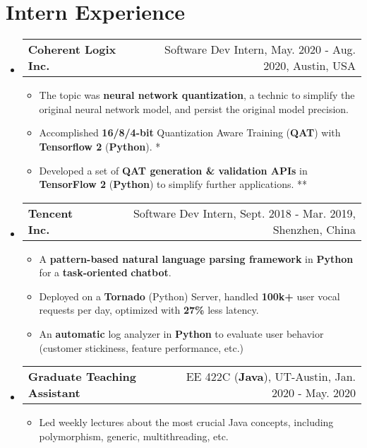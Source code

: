 \documentclass[letterpaper,11pt]{article}
\makeatletter
\newcommand{\resumeItem}[1]{
  \item\small{
    {#1 \vspace{-2pt}}
  }
}
\newcommand{\internSubheading}[2]{
	\vspace{-1pt}\item
	\begin{tabular*}{0.97\textwidth}[t]{l@{\extracolsep{\fill}}r}
		\textbf{#1} & #2 \\
	\end{tabular*}\vspace{-6.5pt}
}
\newcommand{\resumeSubHeadingListStart}{\begin{itemize}[leftmargin=*]}
\newcommand{\resumeSubHeadingListEnd}{\end{itemize}}
\newcommand{\resumeItemListStart}{\begin{itemize}}
\newcommand{\resumeItemListEnd}{\end{itemize}\vspace{-5pt}}
\makeatother
\begin{document}
\section{Intern Experience}
  \resumeSubHeadingListStart
  	\internSubheading
  	{Coherent Logix Inc.}{Software Dev Intern, May. 2020 - Aug. 2020, Austin, USA}
  	\resumeItemListStart
  	\resumeItem
  	{The topic was \textbf{neural network quantization}, a technic to simplify the original neural network model, and persist the original model precision.}
  	\resumeItem
  	{Accomplished \textbf{16/8/4-bit} Quantization Aware Training (\textbf{QAT}) with \textbf{Tensorflow 2} (\textbf{Python}). *}
  	\resumeItem
  	{Developed a set of \textbf{QAT generation \& validation APIs} in \textbf{TensorFlow 2} (\textbf{Python}) to simplify further applications. **}
  	\resumeItemListEnd
  	
    \internSubheading
      {Tencent Inc.}{Software Dev Intern, Sept. 2018 - Mar. 2019, Shenzhen, China}
      \resumeItemListStart
      	\resumeItem
      	  {A \textbf{pattern-based natural language parsing framework} in \textbf{Python} for a \textbf{task-oriented} \textbf{chatbot}. }
      	\resumeItem
          {Deployed on a \textbf{Tornado} (Python) Server, handled \textbf{100k+} user vocal requests per day, optimized with \textbf{27\%} less latency.} 
        \resumeItem
          {An \textbf{automatic} log analyzer in \textbf{Python} to evaluate user behavior (customer stickiness, feature performance, etc.)}
      \resumeItemListEnd
      \internSubheading
      {Graduate Teaching Assistant}
      {EE 422C (\textbf{Java}), UT-Austin, Jan. 2020 - May. 2020}
      \resumeItemListStart
      \resumeItem
      {Led weekly lectures about the most crucial Java concepts, including polymorphism, generic, multithreading, etc. }
      \resumeItemListEnd
      \resumeSubHeadingListEnd
      
\end{document}
